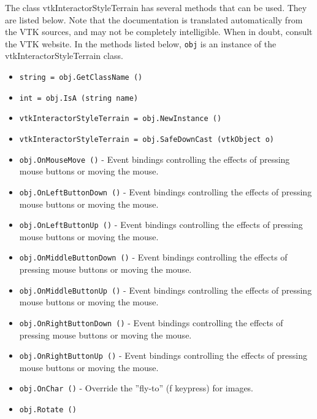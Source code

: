 The class vtkInteractorStyleTerrain has several methods that can be used.
  They are listed below.
Note that the documentation is translated automatically from the VTK sources,
and may not be completely intelligible.  When in doubt, consult the VTK website.
In the methods listed below, \verb|obj| is an instance of the vtkInteractorStyleTerrain class.
\begin{itemize}
\item  \verb|string = obj.GetClassName ()|

\item  \verb|int = obj.IsA (string name)|

\item  \verb|vtkInteractorStyleTerrain = obj.NewInstance ()|

\item  \verb|vtkInteractorStyleTerrain = obj.SafeDownCast (vtkObject o)|

\item  \verb|obj.OnMouseMove ()| -  Event bindings controlling the effects of pressing mouse buttons
 or moving the mouse.

\item  \verb|obj.OnLeftButtonDown ()| -  Event bindings controlling the effects of pressing mouse buttons
 or moving the mouse.

\item  \verb|obj.OnLeftButtonUp ()| -  Event bindings controlling the effects of pressing mouse buttons
 or moving the mouse.

\item  \verb|obj.OnMiddleButtonDown ()| -  Event bindings controlling the effects of pressing mouse buttons
 or moving the mouse.

\item  \verb|obj.OnMiddleButtonUp ()| -  Event bindings controlling the effects of pressing mouse buttons
 or moving the mouse.

\item  \verb|obj.OnRightButtonDown ()| -  Event bindings controlling the effects of pressing mouse buttons
 or moving the mouse.

\item  \verb|obj.OnRightButtonUp ()| -  Event bindings controlling the effects of pressing mouse buttons
 or moving the mouse.

\item  \verb|obj.OnChar ()| -  Override the ''fly-to'' (f keypress) for images.

\item  \verb|obj.Rotate ()|


\end{itemize}
